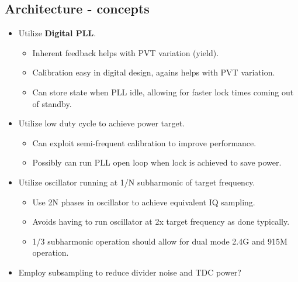 \documentclass[10pt,a4paper]{article}
\begin{document}
		\subsection{Architecture - concepts}
		\begin{itemize}
			\footnotesize
			\item Utilize \textbf{Digital PLL}.\@ 
			\begin{itemize}
				\footnotesize
				\item Inherent feedback helps with PVT variation (yield).
				\item Calibration easy in digital design, agains helps with PVT variation.
				\item Can store state when PLL idle, allowing for faster lock times coming out of standby.
			\end{itemize}       
		  \item Utilize low duty cycle to achieve power target.     
			\begin{itemize}
				\footnotesize
				\item Can exploit semi-frequent calibration to improve performance.
				\item Possibly can run PLL open loop when lock is achieved to save power.
			\end{itemize} 
		  \item Utilize oscillator running at 1/N subharmonic of target frequency.
			\begin{itemize}
				\footnotesize
				\item Use 2N phases in oscillator to achieve equivalent IQ sampling.
				\item Avoids having to run oscillator at 2x target frequency as done typically.
				\item 1/3 subharmonic operation should allow for dual mode 2.4G and 915M operation.
			\end{itemize} 
			\item Employ subsampling to reduce divider noise and TDC power?
		\end{itemize}

		\flushleft
\end{document}
